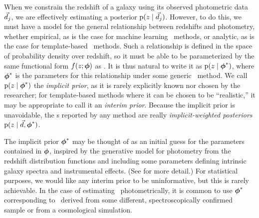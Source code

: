 When we constrain the redshift of a galaxy using its observed photometric data $\vec{d}_{j}$, we are effectively estimating a posterior $\mathrm{p}(z \mid \vec{d}_{j})$.
However, to do this, we must have a model for the general relationship between redshifts and photometry, whether empirical, as is the case for machine learning \pzpdf\ methods, or analytic, as is the case for template-based \pzpdf\ methods.
Such a relationship is defined in the space of probability density over redshift, so it must be able to be parameterized by the same functional form $f(z; {\boldsymbol{\phi}})$ as \nz .
It is thus natural to write it as $\mathrm{p}(z \mid {\ensuremath{\boldsymbol{\phi}}}^{*})$, where ${\boldsymbol{\phi}}^{*}$ is the parameters for this relationship under some generic \pzpdf\ method.
We call $\mathrm{p}(z \mid {\ensuremath{\boldsymbol{\phi}}}^{*})$ the \textit{implicit prior}, as it is rarely explicitly known nor chosen by the researcher; for template-based methods where it can be chosen to be ``realistic,'' it may be appropriate to call it an \textit{interim prior}.
Because the implicit prior is unavoidable, the \pzpdf s reported by any method are really \textit{implicit-weighted posteriors} $\mathrm{p}(z \mid \vec{d}, {\boldsymbol{\phi}}^{*})$.


The implicit prior ${\boldsymbol{\phi}}^{*}$ may be thought of as an initial guess for the parameters contained in ${\boldsymbol{\phi}}$, inspired by the generative model for photometry from the redshift distribution functions and including some parameters defining intrinsic galaxy spectra and instrumental effects. 
(See \citealt{benitez_bayesian_2000} for more detail.)  
For statistical purposes, we would like any interim prior to be uninformative, but this is rarely achievable.  
In the case of estimating \nz\ photometrically, it is common to use ${\boldsymbol{\phi}}^{*}$ corresponding to \nz\ derived from some different, spectroscopically confirmed sample or from a cosmological simulation.

